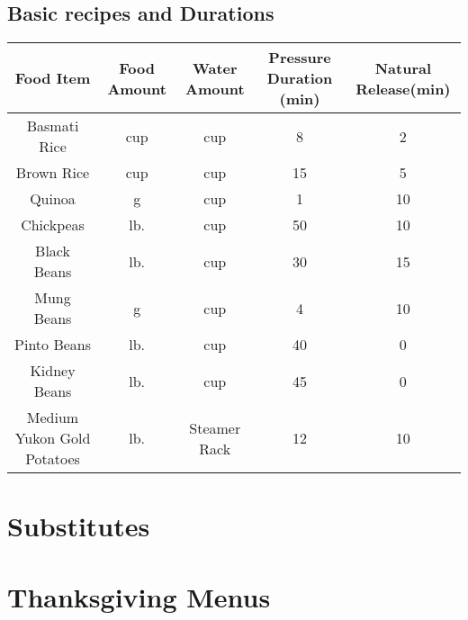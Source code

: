 \documentclass{article}
\begin{document}
\subsection*{Basic recipes and Durations}
\begin{table}[H]
    \centering
    \begin{tabular}{ccccc}
        Food Item & Food Amount & Water Amount & Pressure Duration (min) & Natural Release(min) \\ \hline
        Basmati Rice & \unit[1]{cup} & \unit[1]{cup} & 8 & 2\\ \hline
        Brown Rice & \unit[1]{cup} & \unit[1]{cup} & 15 & 5 \\ \hline
        Quinoa & \unit[190]{g} & \unit[1]{cup} & 1 & 10 \\ \hline
        Chickpeas & \unit[1]{lb.} & \unit[6]{cup} & 50 & 10 \\ \hline
        Black Beans & \unit[1]{lb.} & \unit[6]{cup} & 30 & 15 \\ \hline
        Mung Beans & \unit[205]{g} & \unit[3]{cup} & 4 & 10 \\ \hline
	Pinto Beans & \unit[1]{lb.} & \unit[6]{cup} & 40 & 0 \\ \hline
        Kidney Beans & \unit[1]{lb.} & \unit[6]{cup} & 45 & 0 \\ \hline
	Medium Yukon Gold Potatoes & \unit[3-4]{lb.} & Steamer Rack & 12 & 10 \\
    \end{tabular}
    \label{tab:InstantPot}
\end{table}

\newpage


\newpage


\newpage


\newpage

\begin{appendices}        
\section{Substitutes}


\section{Thanksgiving Menus}


\printindex
\end{appendices}        
\end{document}
